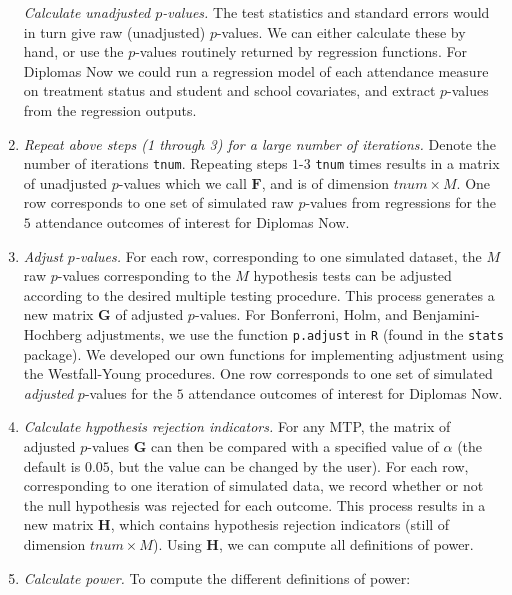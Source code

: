 \documentclass[
]{article}
\begin{document}
\begin{enumerate}
  \emph{Calculate unadjusted \(p\)-values.} The test statistics and
  standard errors would in turn give raw (unadjusted) \(p\)-values. We
  can either calculate these by hand, or use the \(p\)-values routinely
  returned by regression functions. For Diplomas Now we could run a
  regression model of each attendance measure on treatment status and
  student and school covariates, and extract \(p\)-values from the
  regression outputs.
\item
  \emph{Repeat above steps (1 through 3) for a large number of
  iterations.} Denote the number of iterations \texttt{tnum}. Repeating
  steps \(1\)-\(3\) \texttt{tnum} times results in a matrix of
  unadjusted \(p\)-values which we call \(\mathbf{F}\), and is of
  dimension \(tnum \times M\). One row corresponds to one set of
  simulated raw \(p\)-values from regressions for the \(5\) attendance
  outcomes of interest for Diplomas Now.
\item
  \emph{Adjust \(p\)-values.} For each row, corresponding to one
  simulated dataset, the \(M\) raw \(p\)-values corresponding to the
  \(M\) hypothesis tests can be adjusted according to the desired
  multiple testing procedure. This process generates a new matrix
  \(\mathbf{G}\) of adjusted \(p\)-values. For Bonferroni, Holm, and
  Benjamini-Hochberg adjustments, we use the function \texttt{p.adjust}
  in \texttt{R} (found in the \texttt{stats} package). We developed our
  own functions for implementing adjustment using the Westfall-Young
  procedures. One row corresponds to one set of simulated
  \emph{adjusted} \(p\)-values for the \(5\) attendance outcomes of
  interest for Diplomas Now.
\item
  \emph{Calculate hypothesis rejection indicators.} For any MTP, the
  matrix of adjusted \(p\)-values \(\mathbf{G}\) can then be compared
  with a specified value of \(\alpha\) (the default is \(0.05\), but the
  value can be changed by the user). For each row, corresponding to one
  iteration of simulated data, we record whether or not the null
  hypothesis was rejected for each outcome. This process results in a
  new matrix \(\mathbf{H}\), which contains hypothesis rejection
  indicators (still of dimension \(tnum \times M\)). Using
  \(\mathbf{H}\), we can compute all definitions of power.
\item
  \emph{Calculate power.} To compute the different definitions of power:
\end{enumerate}
\end{document}
